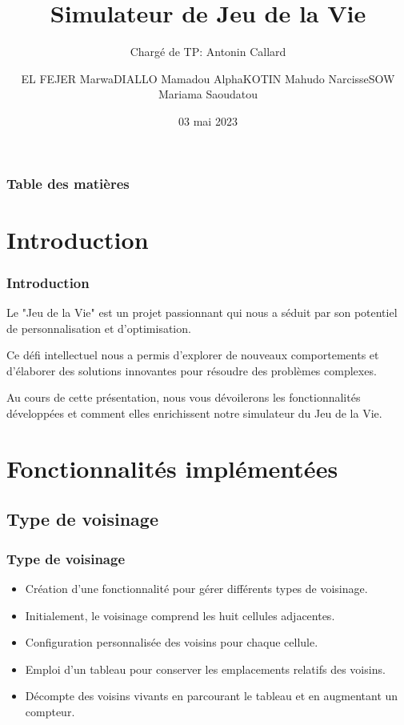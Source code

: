 \documentclass{beamer}
\title{Simulateur de Jeu de la Vie}
\author{EL FEJER Marwa\newline DIALLO Mamadou Alpha\newline KOTIN Mahudo Narcisse\newline SOW Mariama Saoudatou}
\institute{Licence 2 informatique}
\subtitle{Chargé de TP: Antonin Callard}
\date{03 mai 2023}
\begin{document}
\maketitle
\begin{frame}
  \frametitle{Table des matières}
  \tableofcontents
\end{frame}

\section{Introduction}



\begin{frame}
  \frametitle{Introduction}
  
   Le "Jeu de la Vie" est un projet passionnant qui nous a séduit par son potentiel de personnalisation et d'optimisation.\newline 
   
   Ce défi intellectuel nous a permis d'explorer de nouveaux comportements et d'élaborer des solutions innovantes pour résoudre des problèmes complexes.\newline
    
   Au cours de cette présentation, nous vous dévoilerons les fonctionnalités développées et comment elles enrichissent notre simulateur du Jeu de la Vie.

\end{frame}

\section{Fonctionnalités implémentées}

\subsection{Type de voisinage}
\begin{frame}
  \frametitle{Type de voisinage}
 
 \begin{itemize}
 \item Création d'une fonctionnalité pour gérer différents types de voisinage.
 \item Initialement, le voisinage comprend les huit cellules adjacentes.
 \item Configuration personnalisée des voisins pour chaque cellule.
 \item Emploi d'un tableau pour conserver les emplacements relatifs des voisins.
 \item Décompte des voisins vivants en parcourant le tableau et en augmentant un compteur.
 \end{itemize}

\end{frame}
\end{document}
